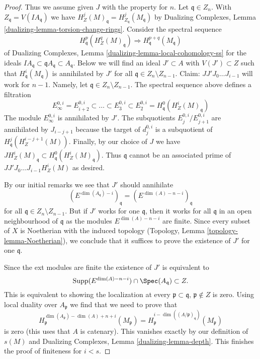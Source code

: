 \begin{proof}
\medskip\noindent
Thus we assume given $J$ with the property for $n$. Let $\mathfrak q \in Z_n$.
With $Z_\mathfrak q = V(IA_\mathfrak q)$ we have
$H^j_Z(M)_\mathfrak q = H^j_{Z_\mathfrak q}(M_\mathfrak q)$
by Dualizing Complexes, Lemma \ref{dualizing-lemma-torsion-change-rings}.
Consider the spectral sequence
$$
H_\mathfrak q^p(H^q_Z(M)_\mathfrak q) \Rightarrow
H^{p + q}_\mathfrak q(M_\mathfrak q)
$$
of Dualizing Complexes, Lemma \ref{dualizing-lemma-local-cohomology-ss}
for the ideals
$IA_\mathfrak q \subset \mathfrak qA_\mathfrak q \subset A_\mathfrak q$.
Below we will find an ideal $J' \subset A$ with $V(J') \subset Z$
such that $H^i_\mathfrak q(M_\mathfrak q)$ is annihilated by $J'$ for all
$\mathfrak q \in Z_n \setminus Z_{n - 1}$.
Claim: $JJ'J_0 \ldots J_{i - 1}$ will work for $n - 1$.
Namely, let $\mathfrak q \in Z_n \setminus Z_{n - 1}$.
The spectral sequence above defines a filtration
$$
E_\infty^{0, i} = E_{i + 2}^{0, i} \subset \ldots \subset E_3^{0, i} \subset
E_2^{0, i} = H^0_\mathfrak q(H^i_Z(M)_\mathfrak q)
$$
The module $E_\infty^{0, i}$ is annihilated by $J'$. The subquotients
$E_j^{0, i}/E_{j + 1}^{0, i}$ are annihilated by $J_{i - j + 1}$
because the target of $d_j^{0, i}$ is a subquotient of
$H^j_\mathfrak q(H^{i - j + 1}_Z(M))$.
Finally, by our choice of $J$ we have
$J H^i_Z(M)_\mathfrak q \subset H^0_\mathfrak q(H^i_Z(M)_\mathfrak q)$.
Thus $\mathfrak q$ cannot be an associated prime of
$JJ'J_0 \ldots J_{i - 1}H^i_Z(M)$ as desired.

\medskip\noindent
By our initial remarks we see that $J'$ should annihilate
$$
(E^{\dim(A_\mathfrak q) - i})_\mathfrak q =
(E^{\dim(A) - n - i})_\mathfrak q
$$
for all $\mathfrak q \in Z_n \setminus Z_{n - 1}$.
But if $J'$ works for one $\mathfrak q$, then it works for all
$\mathfrak q$ in an open neighbourhood of $\mathfrak q$
as the modules $E^{\dim(A) - n - i}$ are finite.
Since every subset of $X$ is Noetherian with the induced
topology (Topology, Lemma \ref{topology-lemma-Noetherian}),
we conclude that it suffices
to prove the existence of $J'$ for one $\mathfrak q$.

\medskip\noindent
Since the ext modules are finite the existence of $J'$ is
equivalent to
$$
\text{Supp}(E^{\dim(A) - n - i}) \cap \Spec(A_\mathfrak q) \subset Z.
$$
This is equivalent to showing the localization at every
$\mathfrak p \subset \mathfrak q$, $\mathfrak p \not \in Z$
is zero. Using local duality over $A_\mathfrak p$ we find that we need
to prove that
$$
H^{\dim(A_\mathfrak p) - \dim(A) + n + i}_\mathfrak p(M_\mathfrak p) =
H^{i - \dim((A/\mathfrak p)_\mathfrak q)}_\mathfrak p(M_\mathfrak p)
$$
is zero (this uses that $A$ is catenary). This vanishes exactly by
our definition of $s(M)$ and
Dualizing Complexes, Lemma \ref{dualizing-lemma-depth}.
This finishes the proof of finiteness for $i < s$.


\end{proof}
